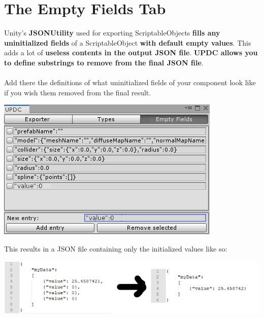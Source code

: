 \documentclass[10pt,a4paper]{article}
\begin{document}
\section{The Empty Fields Tab}
Unity's \textbf{JSONUtility} used for exporting ScriptableObjects \textbf{fills any uninitialized fields} of a ScriptableObject \textbf{with default empty values}. This adds a lot of \textbf{useless contents in the output JSON file}. \textbf{UPDC allows you to define substrings to remove from the final JSON file}.\\\\
Add there the definitions of what uninitialized fields of your component look like if you wish them removed from the final result.
\begin{center}
\includegraphics[scale=0.75]{emptyDefinition}
\end{center}
This results in a JSON file containing only the initialized values like so:
\begin{center}
\includegraphics[scale=1.0]{cleaningJson}
\end{center}
\end{document}
